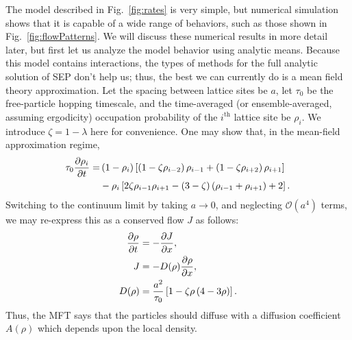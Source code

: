 The model described in Fig.~\ref{fig:rates} is very simple, but numerical simulation shows that it is capable of a wide range of behaviors, such as those shown in Fig.~\ref{fig:flowPatterns}. We will discuss
these numerical results in more detail later, but first let us analyze the model behavior using analytic means.
Because this model contains interactions, the types of methods for the full analytic solution of SEP don't help us; thus, the best we can currently do is a mean field theory approximation.
Let the spacing between lattice sites be $a$, let $\tau_0$ be the free-particle hopping timescale, and the time-averaged (or ensemble-averaged, assuming ergodicity) occupation probability of the $i^{\mathrm{th}}$ lattice site be $\rho_i$.
We introduce $\zeta = 1 - \lambda $ here for convenience.
One may show that, in the mean-field approximation regime,
\begin{align}
\begin{split}
 \tau_0 \frac{\partial \rho_i}{\partial t} = &\left( 1-\rho_i \right) \left[ \left(1-\zeta\rho_{i-2} \right) \rho_{i-1} + \left(1-\zeta\rho_{i+2} \right) \rho_{i+1} \right] \\
 &- \rho_i \left[ 2 \zeta \rho_{i-1} \rho_{i+1}  - (3-\zeta)\left(\rho_{i-1} + \rho_{i+1}\right) + 2 \right].
 \end{split}
 \end{align}
Switching to the continuum limit by taking $a\rightarrow 0$, and neglecting $\mathcal{O}(a^4)$ terms, we may re-express this as a conserved flow $J$ as follows:
\begin{align}
 \frac{\partial \rho}{\partial t} &= - \frac{\partial J}{\partial x}, \\
 J &= -  D(\rho) \frac{\partial \rho}{\partial x}, \\
 D(\rho) &= \frac{a^2}{\tau_0} \left[1 - \zeta \rho\left(4-3\rho\right) \right]. 
\end{align}
Thus, the MFT says that the particles should diffuse with a diffusion coefficient $A(\rho)$ which depends upon the local density.

